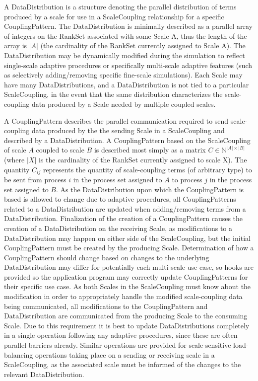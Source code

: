 \documentclass[11pt]{article}
\begin{document}
A DataDistribution is a structure denoting the parallel distribution of terms produced by a scale for use in a ScaleCoupling relationship for a specific CouplingPattern.
The DataDistribution is minimally described as a parallel array of integers on the RankSet associated with some Scale A, thus the length of the array is $|A|$ (the cardinality of the RankSet currently assigned to Scale A).
The DataDistribution may be dynamically modified during the simulation to reflect single-scale adaptive procedures or specifically multi-scale adaptive features (such as selectively adding/removing specific fine-scale simulations).
Each Scale may have many DataDistributions, and a DataDistribution is not tied to a particular ScaleCoupling, in the event that the same distribution characterizes the scale-coupling data produced by a Scale needed by multiple coupled scales.

A CouplingPattern describes the parallel communication required to send scale-coupling data produced by the the sending Scale in a ScaleCoupling and described by a DataDistribution.
A CouplingPattern based on the ScaleCoupling of scale $A$ coupled to scale $B$ is described most simply as a matrix $C \in \mathbb{N}^{|A|\times|B|}$ (where $|X|$ is the cardinality of the RankSet currently assigned to scale X).
The quantity $C_{ij}$ represents the quantity of scale-coupling terms (of arbitrary type) to be sent from process $i$ in the process set assigned to $A$ to process $j$ in the process set assigned to $B$.
As the DataDistribution upon which the CouplingPattern is based is allowed to change due to adaptive procedures, all CouplingPatterns related to a DataDistribution are updated when adding/removing terms from a DataDistribution.
Finalization of the creation of a CouplingPattern causes the creation of a DataDistribution on the receiving Scale, as modifications to a DataDistribution may happen on either side of the ScaleCoupling, but the initial CouplingPattern must be created by the producing Scale.
Determination of how a CouplingPattern should change based on changes to the underlying DataDistribution may differ for potentially each multi-scale use-case, so hooks are provided so the application program may correctly update CouplingPatterns for their specific use case.
As both Scales in the ScaleCoupling must know about the modification in order to appropriately handle the modified scale-coupling data being communicated, all modifications to the CouplingPattern and DataDistribution are communicated from the producing Scale to the consuming Scale.
Due to this requirement it is best to update DataDistributions completely in a single operation following any adaptive procedures, since these are often parallel barriers already.
Similar operations are provided for scale-sensitive load-balancing operations taking place on a sending or receiving scale in a ScaleCoupling, as the associated scale must be informed of the changes to the relevant DataDistribution.
\end{document}
